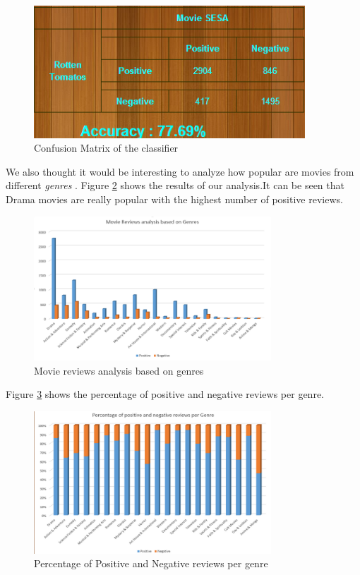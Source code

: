 \begin{figure}[H]
    \centering
    \includegraphics[width=4.0in]{confusion.png}
    \caption{Confusion Matrix of the classifier}
    \label{fig:confusion}
    \end{figure} 
    
 We also thought it would be interesting to analyze how popular are movies from different \textit{genres }. Figure \ref{fig:genres} 
 shows the results of our analysis.It can be seen that Drama movies are really popular with the highest number of positive reviews. 
 \begin{figure}[H]
    \centering
    \includegraphics[width=3.5in]{genres.png}
    \caption{Movie reviews analysis based on genres}
    \label{fig:genres}
    \end{figure} 
    Figure \ref{fig:genres2} shows the percentage of positive and negative reviews per genre.
    \begin{figure}[H]
    \centering
    \includegraphics[width=3.5in]{genres2.png}
    \caption{Percentage of Positive and Negative reviews per genre}
    \label{fig:genres2}
    \end{figure} 
    
